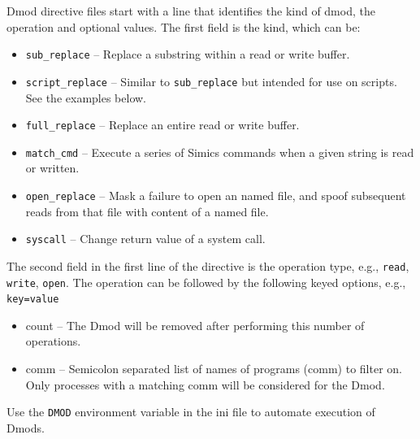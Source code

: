 \documentclass[titlepage]{article}
\begin{document}
Dmod directive files start with a line that identifies the kind of dmod, the operation and optional values.
The first field is the kind, which can be:
\begin {itemize}
\item {\tt sub\_replace} -- Replace a substring within a read or write buffer.
\item {\tt script\_replace} -- Similar to {\tt sub\_replace} but intended for use on scripts.  See the examples below.
\item {\tt full\_replace} -- Replace an entire read or write buffer.
\item {\tt match\_cmd} -- Execute a series of Simics commands when a given string is read or written.
\item {\tt open\_replace} -- Mask a failure to open an named file, and spoof subsequent reads from that file with content of a named file.
\item {\tt syscall} -- Change return value of a system call.
\end{itemize}
The second field in the first line of the directive is the operation type, e.g., {\tt read}, {\tt write}, {\tt open}.
The operation can be followed by the following keyed options, e.g., {\tt key=value}
\begin{itemize}
\item count -- The Dmod will be removed after performing this number of operations. 
\item comm -- Semicolon separated list of names of programs (comm) to filter on.  Only processes with a matching comm will be considered for the Dmod.
\end{itemize}

Use the {\tt DMOD} environment variable in the ini file to automate execution of Dmods.
 
\end{document}
